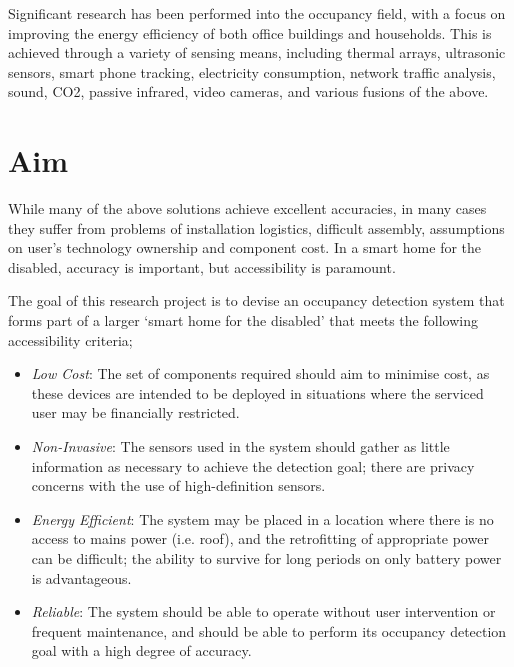 \documentclass[12pt, a4paper]{article}
\begin{document}
Significant research has been performed into the occupancy field, with a focus on improving the energy efficiency of both office buildings and households. This is achieved through a variety of sensing means, including thermal arrays, \cite{beltran2013thermosense} ultrasonic sensors, \cite{hnat2012doorjamb} smart phone tracking, \cite{kleiminger2013using}\cite{balaji2013sentinel} electricity consumption, \cite{kleiminger2013occupancy} network traffic analysis, \cite{ting2013occupancy} sound, \cite{hailemariam2011real} CO2, \cite{hailemariam2011real} passive infrared, \cite{hailemariam2011real} video cameras, \cite{erickson2013poem} and various fusions of the above. \cite{yang2012multi}\cite{ting2013occupancy}


\section*{Aim}

While many of the above solutions achieve excellent accuracies, in many cases they suffer from problems of installation logistics, difficult assembly, assumptions on user's technology ownership and component cost. In a smart home for the disabled, accuracy is important, but accessibility is paramount.

The goal of this research project is to devise an occupancy detection system that forms part of a larger `smart home for the disabled' that meets the following accessibility criteria;

\begin{itemize}
 \item \emph{Low Cost}: The set of components required should aim to minimise cost, as these devices are intended to be deployed in situations where the serviced user may be financially restricted.
 
 \item \emph{Non-Invasive}: The sensors used in the system should gather as little information as necessary to achieve the detection goal; there are privacy concerns with the use of high-definition sensors.
 
 \item \emph{Energy Efficient}: The system may be placed in a location where there is no access to mains power (i.e. roof), and the retrofitting of appropriate power can be difficult; the ability to survive for long periods on only battery power is advantageous.
 
 \item \emph{Reliable}: The system should be able to operate without user intervention or frequent maintenance, and should be able to perform its occupancy detection goal with a high degree of accuracy.
\end{itemize}
\end{document}
